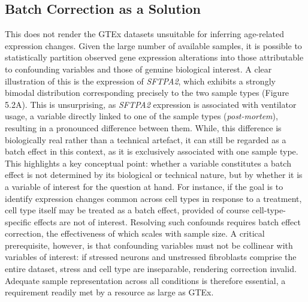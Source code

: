 \subsection{Batch Correction as a Solution}

This does not render the GTEx datasets\cite{lonsdale_genotype-tissue_2013} unsuitable for inferring age-related expression changes. Given the large number of available samples, it is possible to statistically partition observed gene expression alterations into those attributable to confounding variables and those of genuine biological interest.
A clear illustration of this is the expression of \textit{SFTPA2}, which exhibits a strongly bimodal distribution corresponding precisely to the two sample types (Figure 5.2A). This is unsurprising, as \textit{SFTPA2} expression is associated with ventilator usage\cite{mccall_complex_2016}, a variable directly linked to one of the sample types (\textit{post-mortem}), resulting in a pronounced difference between them. While, this difference is biologically real rather than a technical artefact, it can still be regarded as a batch effect in this context, as it is exclusively associated with one sample type. 
\linebreak
\noindent
This highlights a key conceptual point: whether a variable constitutes a batch effect is not determined by its biological or technical nature, but by whether it is a variable of interest for the question at hand. For instance, if the goal is to identify expression changes common across cell types in response to a treatment, cell type itself may be treated as a batch effect, provided of course cell-type-specific effects are not of interest.
Resolving such confounds requires batch effect correction, the effectiveness of which scales with sample size. A critical prerequisite, however, is that confounding variables must not be collinear with variables of interest: if stressed neurons and unstressed fibroblasts comprise the entire dataset, stress and cell type are inseparable, rendering correction invalid. Adequate sample representation across all conditions is therefore essential, a requirement readily met by a resource as large as GTEx\cite{lonsdale_genotype-tissue_2013, schneider_voyager_2024}.
\\
\\
